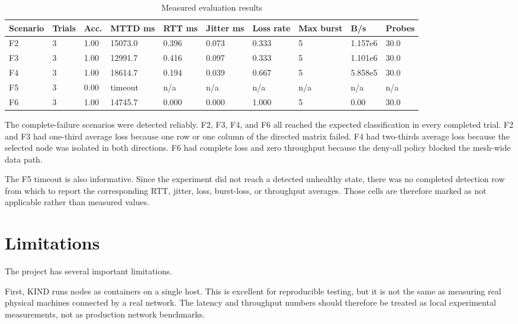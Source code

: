 \documentclass[11pt,a4paper]{article}
\begin{document}
\begin{table}[h]
\centering
\caption{Measured evaluation results}
\label{tab:results}
\scriptsize
\begin{tabularx}{\textwidth}{@{}lYYYYYYYYY@{}}
\toprule
\textbf{Scenario} & \textbf{Trials} & \textbf{Acc.} & \textbf{MTTD ms} & \textbf{RTT ms} & \textbf{Jitter ms} & \textbf{Loss rate} & \textbf{Max burst} & \textbf{B/s} & \textbf{Probes} \\
\midrule
F2 & 3 & 1.00 & 15073.0 & 0.396 & 0.073 & 0.333 & 5 & 1.157e6 & 30.0 \\
F3 & 3 & 1.00 & 12991.7 & 0.416 & 0.097 & 0.333 & 5 & 1.101e6 & 30.0 \\
F4 & 3 & 1.00 & 18614.7 & 0.194 & 0.039 & 0.667 & 5 & 5.858e5 & 30.0 \\
F5 & 3 & 0.00 & timeout & n/a & n/a & n/a & n/a & n/a & n/a \\
F6 & 3 & 1.00 & 14745.7 & 0.000 & 0.000 & 1.000 & 5 & 0.00 & 30.0 \\
\bottomrule
\end{tabularx}
\end{table}

The complete-failure scenarios were detected reliably. F2, F3, F4, and F6 all reached the expected classification in every completed trial. F2 and F3 had one-third average loss because one row or one column of the directed matrix failed. F4 had two-thirds average loss because the selected node was isolated in both directions. F6 had complete loss and zero throughput because the deny-all policy blocked the mesh-wide data path.

The F5 timeout is also informative. Since the experiment did not reach a detected unhealthy state, there was no completed detection row from which to report the corresponding RTT, jitter, loss, burst-loss, or throughput averages. Those cells are therefore marked as not applicable rather than measured values.

\section{Limitations}

The project has several important limitations.

First, KIND runs nodes as containers on a single host. This is excellent for reproducible testing, but it is not the same as measuring real physical machines connected by a real network. The latency and throughput numbers should therefore be treated as local experimental measurements, not as production network benchmarks.
\end{document}
